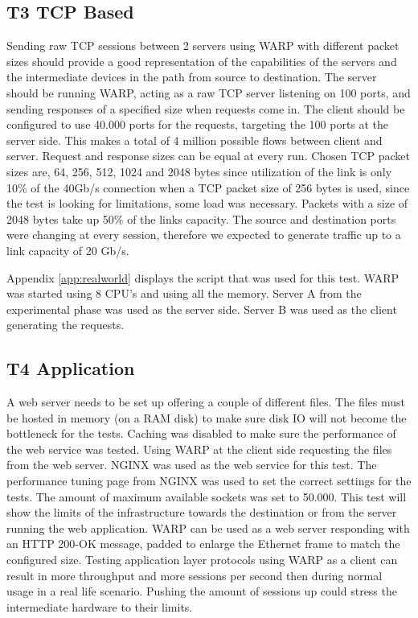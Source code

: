 \subsection{T3 TCP Based}
Sending raw TCP sessions between 2 servers using WARP with different packet sizes should provide a good representation of the capabilities of the servers and the intermediate devices in the path from source to destination. 
The server should be running WARP, acting as a raw TCP server listening on 100 ports, and sending responses of a specified size when requests come in. The client should be configured to use 40.000 ports for the requests, targeting the 100 ports at the server side. This makes a total of 4 million possible flows between client and server. Request and response sizes can be equal at every run. 
Chosen TCP packet sizes are, 64, 256, 512, 1024 and 2048 bytes since utilization of the link is only 10\% of the 40Gb/s connection when a TCP packet size of 256 bytes is used, since the test is looking for limitations, some load was necessary. Packets with a size of 2048 bytes take up 50\% of the links capacity.   
The source and destination ports were changing at every session, therefore we expected to generate traffic up to a link capacity of 20 Gb/s.  

Appendix \ref{app:realworld} displays the script that was used for this test. WARP was started using 8 CPU's and using all the memory. 
Server A from the experimental phase was used as the server side. Server B was used as the client generating the requests.

\subsection{T4 Application}\label{sub:t4real}
A web server needs to be set up offering a couple of different files. The files must be hosted in memory (on a RAM disk) to make sure disk IO will not become the bottleneck for the tests. Caching was disabled to make sure the performance of the web service was tested. Using WARP at the client side requesting the files from the web server. NGINX\cite{nginx} was used as the web service for this test. The performance tuning page from NGINX was used to set the correct settings for the tests\cite{nginxtuning}. The amount of maximum available sockets was set to 50.000. This test will show the limits of the infrastructure towards the destination or from the server running the web application. 
WARP can be used as a web server responding with an HTTP 200-OK message, padded to enlarge the Ethernet frame to match the configured size. Testing application layer protocols using WARP as a client can result in more throughput and more sessions per second then during normal usage in a real life scenario. 
Pushing the amount of sessions up could stress the intermediate hardware to their limits.

\
